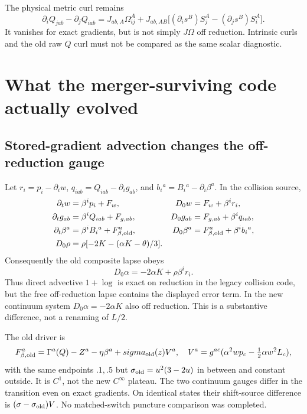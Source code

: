 \documentclass[11pt,letterpaper]{article}
\newcommand{\D}{D_0}\newcommand{\TF}{\operatorname{TF}}\newcommand{\tr}{\operatorname{tr}}
\begin{document}
The physical metric curl remains
\begin{equation}
\partial_iQ_{jab}-\partial_jQ_{iab}
=J_{ab,A}\Omega_{ij}^A+
J_{ab,AB}\big[(\partial_is^B)S_j^A-(\partial_js^B)S_i^A\big].
\end{equation}
It vanishes for exact gradients, but is not simply $J\Omega$ off reduction. Intrinsic curls and the old raw $Q$ curl must not be compared as the same scalar diagnostic.

\section{What the merger-surviving code actually evolved}
\subsection{Stored-gradient advection changes the off-reduction gauge}
Let $r_i=p_i-\partial_iw$, $q_{iab}=Q_{iab}-\partial_ig_{ab}$, and $b_i{}^a=B_i{}^a-\partial_i\beta^a$. In the collision source,
\begin{align}
\partial_tw&=\beta^ip_i+F_w,&\D w&=F_w+\beta^ir_i,\\
\partial_tg_{ab}&=\beta^iQ_{iab}+F_{g,ab},&\D g_{ab}&=F_{g,ab}+\beta^iq_{iab},\\
\partial_t\beta^a&=\beta^iB_i{}^a+F_{\beta,\rm old}^a,&
\D\beta^a&=F_{\beta,\rm old}^a+\beta^ib_i{}^a,\\
\D\rho&=\rho[-2K-(\alpha K-\theta)/3].
\end{align}
Consequently the old composite lapse obeys
\begin{equation}\boxed{\D\alpha=-2\alpha K+\rho\beta^ir_i.}\end{equation}
Thus direct advective $1+\log$ is exact on reduction in the legacy collision code, but the free off-reduction lapse contains the displayed error term. In the new continuum system $\D\alpha=-2\alpha K$ also off reduction. This is a substantive difference, not a renaming of $L/2$.

The old driver is
\begin{equation}
F_{\beta,\rm old}^a=\Gamma^a(Q)-Z^a-\eta\beta^a+sigma_{\rm old}(z)V^a,
\quad V^a=g^{ac}(\alpha^2wp_c-\tfrac12\alpha w^2L_c),
\end{equation}
with the same endpoints $.1,.5$ but $\sigma_{\rm old}=u^2(3-2u)$ in between and constant outside. It is $C^1$, not the new $C^\infty$ plateau. The two continuum gauges differ in the transition even on exact gradients. On identical states their shift-source difference is $(\sigma-\sigma_{\rm old})V$. No matched-switch puncture comparison was completed.
\end{document}
